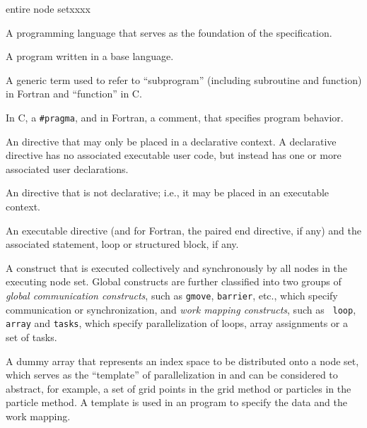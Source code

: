 \begin{namelist}{entire node setxxxx}


 A programming language that serves as the foundation of the {\XMP}
 specification.


 A program written in a base language.


 A generic term used to refer to ``subprogram'' (including subroutine and
 function) in Fortran and ``function'' in C.


 In C, a {\tt \#pragma}, and in Fortran, a comment, that specifies
 {\XMP} program behavior.


 An {\XMP} directive that may only be placed in a declarative context. A
 declarative directive has no associated executable user code, but
 instead has one or more associated user declarations.


 An {\XMP} directive that is not declarative; i.e., it may be placed in
 an executable context.


 An {\XMP} executable directive (and for Fortran, the paired end
 directive, if any) and the associated statement, loop or structured
 block, if any.



 A construct that is executed collectively and synchronously by all
 nodes in the executing node set. Global constructs are further
 classified into two groups of {\it global communication constructs},
 such as {\tt gmove}, {\tt barrier}, etc., which specify communication
 or synchronization, and {\it work mapping constructs}, such as {\tt
 loop}, {\tt array} and {\tt tasks}, which specify parallelization of
 loops, array assignments or a set of tasks.


 A dummy array that represents an index space to be distributed onto a
 node set, which serves as the ``template'' of parallelization in
 {\XMP} and can be considered to abstract, for example, a set of grid
 points in the grid method or particles in the particle method.
%
 A template is used in an {\XMP} program to specify the data and the
 work mapping.


\end{namelist}

